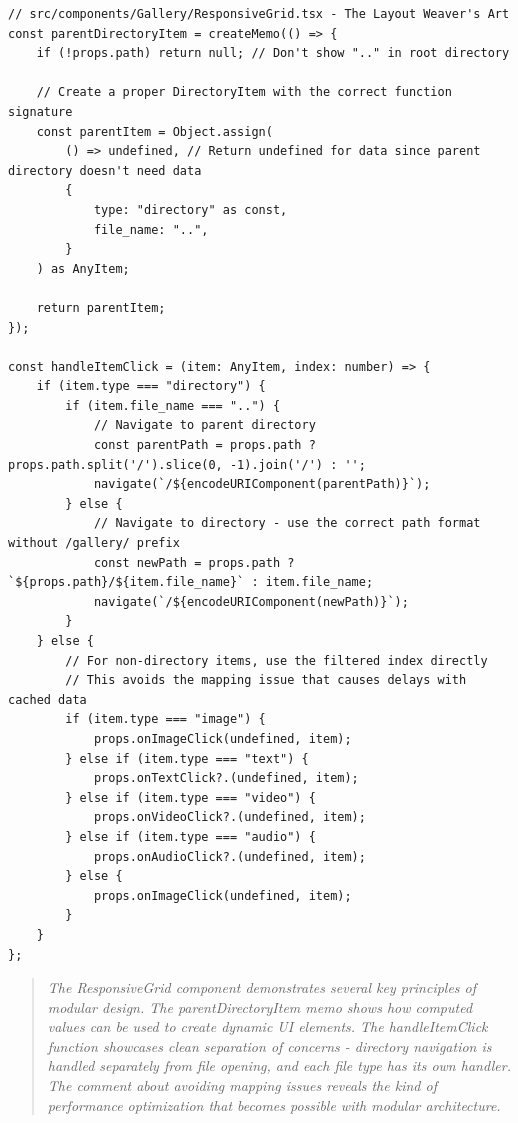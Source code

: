 \documentclass[11pt]{article}
\begin{document}
\begin{lstlisting}[style=typescript]
// src/components/Gallery/ResponsiveGrid.tsx - The Layout Weaver's Art
const parentDirectoryItem = createMemo(() => {
    if (!props.path) return null; // Don't show ".." in root directory

    // Create a proper DirectoryItem with the correct function signature
    const parentItem = Object.assign(
        () => undefined, // Return undefined for data since parent directory doesn't need data
        {
            type: "directory" as const,
            file_name: "..",
        }
    ) as AnyItem;

    return parentItem;
});

const handleItemClick = (item: AnyItem, index: number) => {
    if (item.type === "directory") {
        if (item.file_name === "..") {
            // Navigate to parent directory
            const parentPath = props.path ? props.path.split('/').slice(0, -1).join('/') : '';
            navigate(`/${encodeURIComponent(parentPath)}`);
        } else {
            // Navigate to directory - use the correct path format without /gallery/ prefix
            const newPath = props.path ? `${props.path}/${item.file_name}` : item.file_name;
            navigate(`/${encodeURIComponent(newPath)}`);
        }
    } else {
        // For non-directory items, use the filtered index directly
        // This avoids the mapping issue that causes delays with cached data
        if (item.type === "image") {
            props.onImageClick(undefined, item);
        } else if (item.type === "text") {
            props.onTextClick?.(undefined, item);
        } else if (item.type === "video") {
            props.onVideoClick?.(undefined, item);
        } else if (item.type === "audio") {
            props.onAudioClick?.(undefined, item);
        } else {
            props.onImageClick(undefined, item);
        }
    }
};
\end{lstlisting}

\begin{quote}
\emph{The ResponsiveGrid component demonstrates several key principles of modular design. The parentDirectoryItem memo shows how computed values can be used to create dynamic UI elements. The handleItemClick function showcases clean separation of concerns - directory navigation is handled separately from file opening, and each file type has its own handler. The comment about avoiding mapping issues reveals the kind of performance optimization that becomes possible with modular architecture.}
\end{quote}
\end{document}
